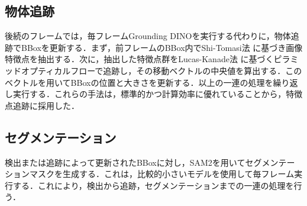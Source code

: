 \newpage

\subsection{物体追跡}
後続のフレームでは，毎フレームGrounding DINOを実行する代わりに，物体追跡でBBoxを更新する．まず，前フレームのBBox内でShi-Tomasi法 \cite{shi_tomasi} に基づき画像特徴点を抽出する．次に，抽出した特徴点群をLucas-Kanade法 \cite{lucas_kanade} に基づくピラミッドオプティカルフローで追跡し，その移動ベクトルの中央値を算出する．このベクトルを用いてBBoxの位置と大きさを更新する．以上の一連の処理を繰り返し実行する．これらの手法は，標準的かつ計算効率に優れていることから，特徴点追跡に採用した．

\subsection{セグメンテーション}
検出または追跡によって更新されたBBoxに対し，SAM2を用いてセグメンテーションマスクを生成する．これは，比較的小さいモデルを使用して毎フレーム実行する．これにより，検出から追跡，セグメンテーションまでの一連の処理を行う．

\newpage
